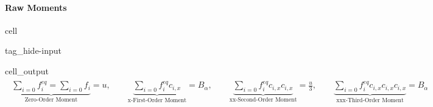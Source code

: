 \documentclass[letterpaper,10pt,english,openany,oneside]{jupyterBook}
\begin{document}
\paragraph{Raw Moments}
\label{\detokenize{LBM-Study/Convective-Equation:raw-moments}}
\begin{sphinxuseclass}{cell}
\begin{sphinxuseclass}{tag_hide-input}\begin{sphinxVerbatimOutput}

\begin{sphinxuseclass}{cell_output}\begin{equation*}
\begin{split}\displaystyle \begin{gathered}\underbrace{\sum_{i=0} f_{i}^{eq} =\sum_{i=0} f_{i} }_{\textrm{Zero-Order Moment}} =u,\quad \quad \underbrace{\sum_{i=0} f_{i}^{eq}c_{i,x} }_{\textrm{x-First-Order Moment}} =B_{\alpha},\quad \quad \underbrace{\sum_{i=0} f_{i}^{eq} c_{i,x}c_{i,x} }_{\textrm{xx-Second-Order Moment}} =\frac{u}{3},\quad \quad \underbrace{\sum_{i=0} f_{i}^{eq} c_{i,x}c_{i,x}c_{i,x} }_{\textrm{xxx-Third-Order Moment}} =B_{\alpha}\end{gathered}\end{split}
\end{equation*}
\end{sphinxuseclass}\end{sphinxVerbatimOutput}

\end{sphinxuseclass}
\end{sphinxuseclass}
\end{document}
